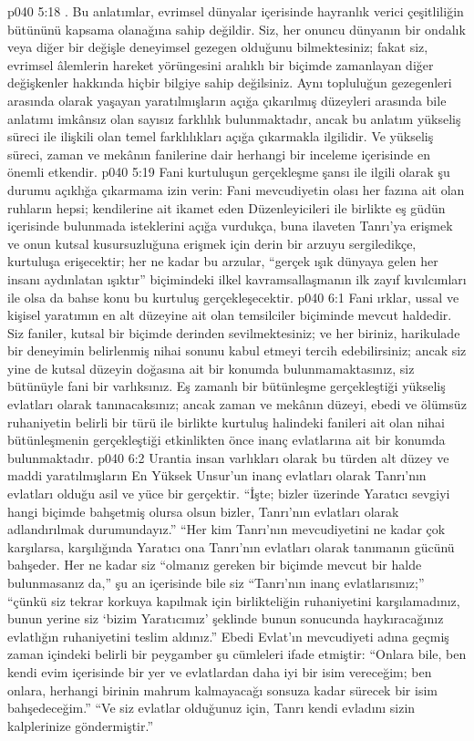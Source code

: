 \vs p040 5:18 . Bu anlatımlar, evrimsel dünyalar içerisinde hayranlık verici çeşitliliğin bütününü kapsama olanağına sahip değildir. Siz, her onuncu dünyanın bir ondalık veya diğer bir değişle deneyimsel gezegen olduğunu bilmektesiniz; fakat siz, evrimsel âlemlerin hareket yörüngesini aralıklı bir biçimde zamanlayan diğer değişkenler hakkında hiçbir bilgiye sahip değilsiniz. Aynı topluluğun gezegenleri arasında olarak yaşayan yaratılmışların açığa çıkarılmış düzeyleri arasında bile anlatımı imkânsız olan sayısız farklılık bulunmaktadır, ancak bu anlatım yükseliş süreci ile ilişkili olan temel farklılıkları açığa çıkarmakla ilgilidir. Ve yükseliş süreci, zaman ve mekânın fanilerine dair herhangi bir inceleme içerisinde en önemli etkendir.
\vs p040 5:19 Fani kurtuluşun gerçekleşme şansı ile ilgili olarak şu durumu açıklığa çıkarmama izin verin: Fani mevcudiyetin olası her fazına ait olan ruhların hepsi; kendilerine ait ikamet eden Düzenleyicileri ile birlikte eş güdün içerisinde bulunmada isteklerini açığa vurdukça, buna ilaveten Tanrı’ya erişmek ve onun kutsal kusursuzluğuna erişmek için derin bir arzuyu sergiledikçe, kurtuluşa erişecektir; her ne kadar bu arzular, “gerçek ışık dünyaya gelen her insanı aydınlatan ışıktır” biçimindeki ilkel kavramsallaşmanın ilk zayıf kıvılcımları ile olsa da bahse konu bu kurtuluş gerçekleşecektir.
\vs p040 6:1 Fani ırklar, ussal ve kişisel yaratımın en alt düzeyine ait olan temsilciler biçiminde mevcut haldedir. Siz faniler, kutsal bir biçimde derinden sevilmektesiniz; ve her biriniz, harikulade bir deneyimin belirlenmiş nihai sonunu kabul etmeyi tercih edebilirsiniz; ancak siz yine de kutsal düzeyin doğasına ait bir konumda bulunmamaktasınız, siz bütünüyle fani bir varlıksınız. Eş zamanlı bir bütünleşme gerçekleştiği yükseliş evlatları olarak tanınacaksınız; ancak zaman ve mekânın düzeyi, ebedi ve ölümsüz ruhaniyetin belirli bir türü ile birlikte kurtuluş halindeki fanileri ait olan nihai bütünleşmenin gerçekleştiği etkinlikten önce inanç evlatlarına ait bir konumda bulunmaktadır.
\vs p040 6:2 Urantia insan varlıkları olarak bu türden alt düzey ve maddi yaratılmışların En Yüksek Unsur’un inanç evlatları olarak Tanrı’nın evlatları olduğu asil ve yüce bir gerçektir. “İşte; bizler üzerinde Yaratıcı sevgiyi hangi biçimde bahşetmiş olursa olsun bizler, Tanrı’nın evlatları olarak adlandırılmak durumundayız.” “Her kim Tanrı’nın mevcudiyetini ne kadar çok karşılarsa, karşılığında Yaratıcı ona Tanrı’nın evlatları olarak tanımanın gücünü bahşeder. Her ne kadar siz “olmanız gereken bir biçimde mevcut bir halde bulunmasanız da,” şu an içerisinde bile siz “Tanrı’nın inanç evlatlarısınız;” “çünkü siz tekrar korkuya kapılmak için birlikteliğin ruhaniyetini karşılamadınız, bunun yerine siz ‘bizim Yaratıcımız’ şeklinde bunun sonucunda haykıracağınız evlatlığın ruhaniyetini teslim aldınız.” Ebedi Evlat’ın mevcudiyeti adına geçmiş zaman içindeki belirli bir peygamber şu cümleleri ifade etmiştir: “Onlara bile, ben kendi evim içerisinde bir yer ve evlatlardan daha iyi bir isim vereceğim; ben onlara, herhangi birinin mahrum kalmayacağı sonsuza kadar sürecek bir isim bahşedeceğim.” “Ve siz evlatlar olduğunuz için, Tanrı kendi evladını sizin kalplerinize göndermiştir.”
